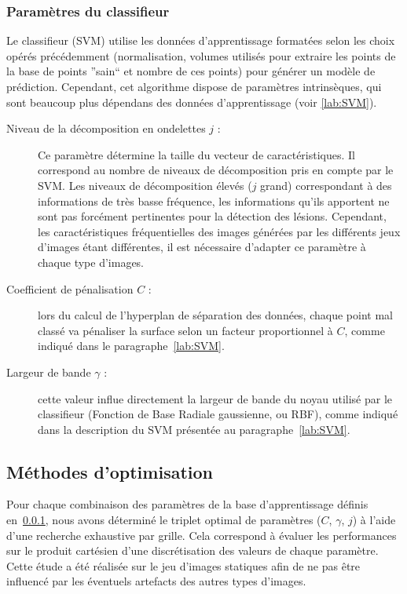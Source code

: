 \subsubsection{Paramètres du classifieur}
\label{lab:paramClassif}
Le classifieur (SVM) utilise les données d'apprentissage formatées selon les choix opérés précédemment (normalisation, volumes utilisés pour extraire les points de la base de points ''sain`` et nombre de ces points) pour générer un modèle de prédiction. Cependant, cet algorithme dispose de paramètres intrinsèques, qui sont beaucoup plus dépendans des données d'apprentissage (voir \ref{lab:SVM}).

\begin{description}
 \item[Niveau de la décomposition en ondelettes $j$ :] Ce paramètre détermine la taille du vecteur de caractéristiques. Il correspond au nombre de niveaux de décomposition pris en compte par le SVM. Les niveaux de décomposition élevés ($j$ grand) correspondant à des informations de très basse fréquence, les informations qu'ils apportent ne sont pas forcément pertinentes pour la détection des lésions. Cependant, les caractéristiques fréquentielles des images générées par les différents jeux d'images étant différentes, il est nécessaire d'adapter ce paramètre à chaque type d'images.
 \item[Coefficient de pénalisation $C$ :] lors du calcul de l'hyperplan de séparation des données, chaque point mal classé va pénaliser la surface selon un facteur proportionnel à $C$, comme indiqué dans le paragraphe~\ref{lab:SVM}.
 \item[Largeur de bande $\gamma$ :] cette valeur influe directement la largeur de bande du noyau utilisé par le classifieur (Fonction de Base Radiale gaussienne, ou RBF), comme indiqué dans la description du SVM présentée au paragraphe~\ref{lab:SVM}.
\end{description}

\subsection{Méthodes d'optimisation}
\label{lab:optimCGJ}

Pour chaque combinaison des paramètres de la base d'apprentissage définis en~\ref{lab:paramClassif}, nous avons déterminé le triplet optimal de paramètres ($C$, $\gamma$, $j$) à l'aide d'une recherche exhaustive par grille. Cela correspond à évaluer les performances sur le produit cartésien d'une discrétisation des valeurs de chaque paramètre. Cette étude a été réalisée sur le jeu d'images statiques afin de ne pas être influencé par les éventuels artefacts des autres types d'images.

